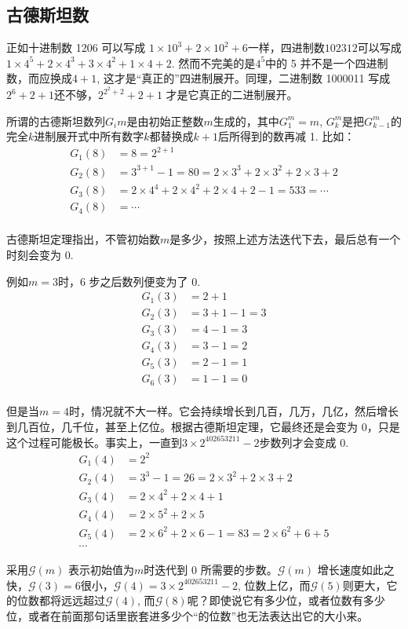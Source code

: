 \documentclass{article}
\theoremstyle{nonumberplain}\theorembodyfont{\normalfont}\theoremsymbol{$\Box$}
\begin{document}
\subsection{古德斯坦数}
正如十进制数 1206 可以写成 $1\times10^3+2\times10^2+6$一样，四进制数$102312$可以写成$1\times4^5+2\times4^3+3\times4^2+1\times4+2$. 然而不完美的是$4^5$中的 5 并不是一个四进制数，而应换成$4+1$, 这才是“真正的”四进制展开。同理，二进制数 1000011 写成$2^6+2+1$还不够，$2^{2^2+2}+2+1$ 才是它真正的二进制展开。

所谓的古德斯坦数列$G_i{m}$是由初始正整数$m$生成的，其中$G_1^m=m$, $G_k^m$是把$G_{k-1}^m$的完全$k$进制展开式中所有数字$k$都替换成$k+1$后所得到的数再减 1. 比如：
\begin{align*}
G_1(8)&=8=2^{2+1}\\
G_2(8)&=3^{3+1}-1=80=2\times3^3+2\times3^2+2\times3+2\\
G_3(8)&=2\times4^4+2\times4^2+2\times4+2-1=533=\cdots\\
G_4(8)&=\cdots\\
\end{align*}

古德斯坦定理指出，不管初始数$m$是多少，按照上述方法迭代下去，最后总有一个时刻会变为 0. 

例如$m=3$时，6 步之后数列便变为了 0.
\begin{align*}
G_1(3)&=2+1\\
G_2(3)&=3+1-1=3\\
G_3(3)&=4-1=3\\
G_4(3)&=3-1=2\\
G_5(3)&=2-1=1\\
G_6(3)&=1-1=0\\
\end{align*}

但是当$m=4$时，情况就不大一样。它会持续增长到几百，几万，几亿，然后增长到几百位，几千位，甚至上亿位。根据古德斯坦定理，它最终还是会变为 0，只是这个过程可能极长。事实上，一直到$3\times2^{402653211}-2$步数列才会变成 0. 
\begin{align*}
G_1(4)&=2^2\\
G_2(4)&=3^3-1=26=2\times3^2+2\times3+2\\
G_3(4)&=2\times4^2+2\times4+1\\
G_4(4)&=2\times5^2+2\times5\\
G_5(4)&=2\times6^2+2\times6-1=83=2\times6^2+6+5\\
\cdots
\end{align*}

\newcommand\Gscr[1]{$\mathscr G(#1)$}
采用\Gscr m 表示初始值为$m$时迭代到 0 所需要的步数。\Gscr m 增长速度如此之快，\Gscr3$=6$很小，\Gscr4$=3\times2^{402653211}-2$, 位数上亿，而\Gscr5则更大，它的位数都将远远超过\Gscr4, 而\Gscr8呢？即使说它有多少位，或者位数有多少位，或者在前面那句话里嵌套进多少个“的位数”也无法表达出它的大小来。
\end{document}
